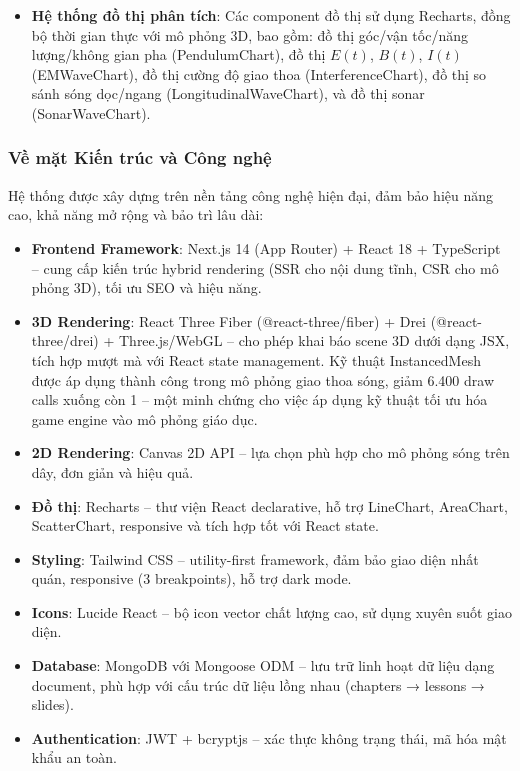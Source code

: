 \begin{itemize}
    
    \item \textbf{Hệ thống đồ thị phân tích}: Các component đồ thị sử dụng Recharts, đồng bộ thời gian thực với mô phỏng 3D, bao gồm: đồ thị góc/vận tốc/năng lượng/không gian pha (PendulumChart), đồ thị $E(t)$, $B(t)$, $I(t)$ (EMWaveChart), đồ thị cường độ giao thoa (InterferenceChart), đồ thị so sánh sóng dọc/ngang (LongitudinalWaveChart), và đồ thị sonar (SonarWaveChart).
\end{itemize}

\subsubsection{Về mặt Kiến trúc và Công nghệ}

Hệ thống được xây dựng trên nền tảng công nghệ hiện đại, đảm bảo hiệu năng cao, khả năng mở rộng và bảo trì lâu dài:

\begin{itemize}
    \item \textbf{Frontend Framework}: Next.js 14 (App Router) + React 18 + TypeScript – cung cấp kiến trúc hybrid rendering (SSR cho nội dung tĩnh, CSR cho mô phỏng 3D), tối ưu SEO và hiệu năng.
    
    \item \textbf{3D Rendering}: React Three Fiber (@react-three/fiber) + Drei (@react-three/drei) + Three.js/WebGL – cho phép khai báo scene 3D dưới dạng JSX, tích hợp mượt mà với React state management. Kỹ thuật InstancedMesh được áp dụng thành công trong mô phỏng giao thoa sóng, giảm 6.400 draw calls xuống còn 1 – một minh chứng cho việc áp dụng kỹ thuật tối ưu hóa game engine vào mô phỏng giáo dục.
    
    \item \textbf{2D Rendering}: Canvas 2D API – lựa chọn phù hợp cho mô phỏng sóng trên dây, đơn giản và hiệu quả.
    
    \item \textbf{Đồ thị}: Recharts – thư viện React declarative, hỗ trợ LineChart, AreaChart, ScatterChart, responsive và tích hợp tốt với React state.
    
    \item \textbf{Styling}: Tailwind CSS – utility-first framework, đảm bảo giao diện nhất quán, responsive (3 breakpoints), hỗ trợ dark mode.
    
    \item \textbf{Icons}: Lucide React – bộ icon vector chất lượng cao, sử dụng xuyên suốt giao diện.
    
    \item \textbf{Database}: MongoDB với Mongoose ODM – lưu trữ linh hoạt dữ liệu dạng document, phù hợp với cấu trúc dữ liệu lồng nhau (chapters → lessons → slides).
    
    \item \textbf{Authentication}: JWT + bcryptjs – xác thực không trạng thái, mã hóa mật khẩu an toàn.
\end{itemize}

